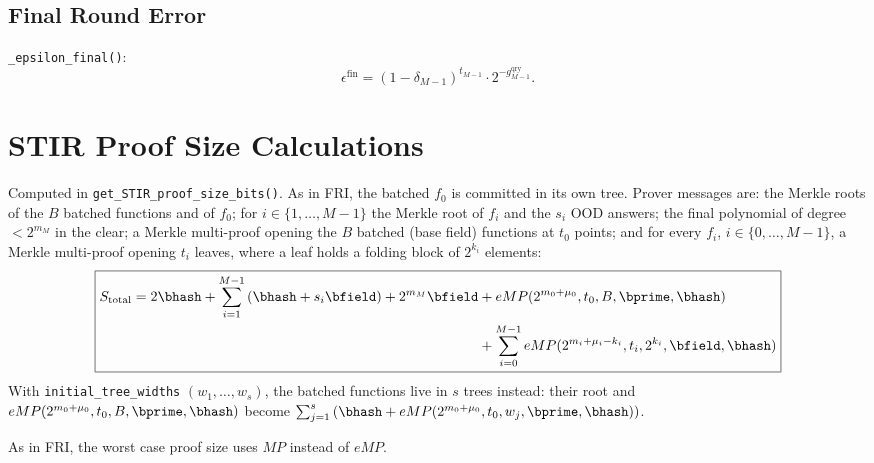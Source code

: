 \subsection{Final Round Error}
\verb|_epsilon_final()|:
\[
  \epsilon^{\mathrm{fin}} = (1-\delta_{M-1})^{t_{M-1}} \cdot 2^{-g^{\mathrm{qry}}_{M-1}}.
\]

\section{STIR Proof Size Calculations}

Computed in \verb|get_STIR_proof_size_bits()|. As in FRI, the batched $f_0$ is committed in its own tree. Prover messages are: the Merkle roots of the $B$ batched functions and of $f_0$; for $i \in \{1,\ldots,M-1\}$ the Merkle root of $f_i$ and the $s_i$ OOD answers; the final polynomial of degree $< 2^{m_M}$ in the clear; a Merkle multi-proof opening the $B$ batched (base field) functions at $t_0$ points; and for every $f_i$, $i\in\{0,\ldots,M-1\}$, a Merkle multi-proof opening $t_i$ leaves, where a leaf holds a folding block of $2^{k_i}$ elements:
\[
\boxed{
\begin{aligned}
S_{\mathrm{total}}
  = 2\bhash + \sum_{i=1}^{M-1}\left(\bhash + s_i \bfield\right) + 2^{m_M}\bfield
  &+ eMP(2^{m_0+\mu_0}, t_0, B, \bprime, \bhash) \\
  &+ \sum_{i=0}^{M-1} eMP(2^{m_i+\mu_i-k_i}, t_i, 2^{k_i}, \bfield, \bhash)
\end{aligned}
}
\]
With \verb|initial_tree_widths| $(w_1, \ldots, w_s)$, the batched functions live in $s$ trees instead: their root and $eMP(2^{m_0+\mu_0}, t_0, B, \bprime, \bhash)$ become $\sum_{j=1}^{s} \left(\bhash + eMP(2^{m_0+\mu_0}, t_0, w_j, \bprime, \bhash)\right)$.

As in FRI, the worst case proof size uses $MP$ instead of $eMP$.
